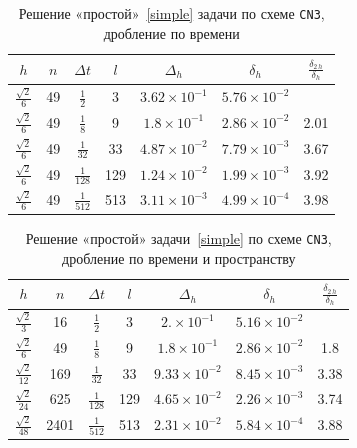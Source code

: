 \renewcommand{\arraystretch}{2}
\begin{table}[H]
	\caption{Решение «простой»~\ref{simple} задачи по схеме \texttt{CN3}, дробление по времени}
	\label{tab:CN3plain}
	\begin{center}\begin{tabular}{|c|c|c|c|c|c|c|}
		\hline
		$h$ & $n$ & $\Delta t$ & $l$ & $\Delta_h$ & $\delta_h$ & $\frac{\delta_{2 \, h}}{\delta_h}$ \\
		\hline
		$\frac{\sqrt{2}}{6}$ & 49 & $\frac{1}{2}$ & 3 & $3.62 \times 10^{-1}$ & $5.76 \times 10^{-2}$ & \\
		\hline
		$\frac{\sqrt{2}}{6}$ & 49 & $\frac{1}{8}$ & 9 & $1.8 \times 10^{-1}$ & $2.86 \times 10^{-2}$ & 2.01 \\
		\hline
		$\frac{\sqrt{2}}{6}$ & 49 & $\frac{1}{32}$ & 33 & $4.87 \times 10^{-2}$ & $7.79 \times 10^{-3}$ & 3.67 \\
		\hline
		$\frac{\sqrt{2}}{6}$ & 49 & $\frac{1}{128}$ & 129 & $1.24 \times 10^{-2}$ & $1.99 \times 10^{-3}$ & 3.92 \\
		\hline
		$\frac{\sqrt{2}}{6}$ & 49 & $\frac{1}{512}$ & 513 & $3.11 \times 10^{-3}$ & $4.99 \times 10^{-4}$ & 3.98 \\
		\hline
	\end{tabular}\end{center}
\end{table}
\begin{table}[H]
	\caption{Решение «простой» задачи~\ref{simple} по схеме \texttt{CN3}, дробление по времени и пространству}
	\label{tab:CN3plainFull}
	\begin{center}\begin{tabular}{|c|c|c|c|c|c|c|}
		\hline
		$h$ & $n$ & $\Delta t$ & $l$ & $\Delta_h$ & $\delta_h$ & $\frac{\delta_{2 \, h}}{\delta_h}$ \\
		\hline
		$\frac{\sqrt{2}}{3}$ & 16 & $\frac{1}{2}$ & 3 & $2. \times 10^{-1}$ & $5.16 \times 10^{-2}$ & \\
		\hline
		$\frac{\sqrt{2}}{6}$ & 49 & $\frac{1}{8}$ & 9 & $1.8 \times 10^{-1}$ & $2.86 \times 10^{-2}$ & 1.8 \\
		\hline
		$\frac{\sqrt{2}}{12}$ & 169 & $\frac{1}{32}$ & 33 & $9.33 \times 10^{-2}$ & $8.45 \times 10^{-3}$ & 3.38 \\
		\hline
		$\frac{\sqrt{2}}{24}$ & 625 & $\frac{1}{128}$ & 129 & $4.65 \times 10^{-2}$ & $2.26 \times 10^{-3}$ & 3.74 \\
		\hline
		$\frac{\sqrt{2}}{48}$ & 2401 & $\frac{1}{512}$ & 513 & $2.31 \times 10^{-2}$ & $5.84 \times 10^{-4}$ & 3.88 \\
		\hline
	\end{tabular}\end{center}
\end{table}
